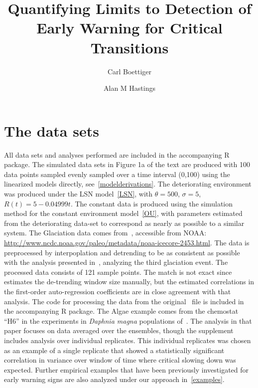 \documentclass[authoryear, preprint,review,12pt]{elsarticle}
\begin{document}
\begin{frontmatter}
\title{Quantifying Limits to Detection of Early Warning for Critical Transitions  }
\author[davis]{Carl Boettiger}
\author[davis]{Alan M Hastings}
\address[davis]{Center for Population Biology, University of California, Davis, United States}


\end{frontmatter}
%
%
%


\appendix

\section{The data sets}
All data sets and analyses performed are included in the accompanying R package.
The simulated data sets in Figure 1a of the text are produced with 100 data points
sampled evenly sampled over a time interval (0,100) using the linearized models directly, see~\ref{modelderivations}.
The deteriorating environment was produced under the LSN model~\eqref{LSN}, with $\theta=500$, $\sigma = 5$, $R(t) = 5 - 0.04999 t$.  
The constant data is produced using the simulation method for the constant environment model~\eqref{OU},
with parameters estimated from the deteriorating data-set to correspond as nearly as possible to a similar system. 
The Glaciation data comes from~\citet{Petit1999}, accessible from NOAA:
\href{http://www.ncdc.noaa.gov/paleo/metadata/noaa-icecore-2453.html}{http://www.ncdc.noaa.gov/paleo/metadata/noaa-icecore-2453.html}.
The data is preprocessed by interpoplation and detrending to be as consistent as possible with the analysis presented in~\citet{Dakos2008},
analyzing the third glaciation event. 
The processed data consists of 121 sample points. 
The match is not exact since~\citet{Dakos2008} estimates the de-trending window size manually,
but the estimated correlations in the first-order auto-regression coefficients are in close agreement with that analysis. 
The code for processing the data from the original~\citet{Petit1999} file is included in the accompanying R package.
The Algae example comes from the chemostat ``H6'' in the experiments in \emph{Daphnia magna} populations of~\citet{Drake2010}. 
The analysis in that paper focuses on data averaged over the ensembles, though the supplement includes analysis over individual replicates. 
This individual replicates was chosen as an example of a single replicate 
that showed a statistically significant correlation in variance over window of time where critical slowing down was expected. 
Further empirical examples that have been previously investigated for early warning signs are also analyzed under our approach in~\ref{examples}.   
\end{document}
